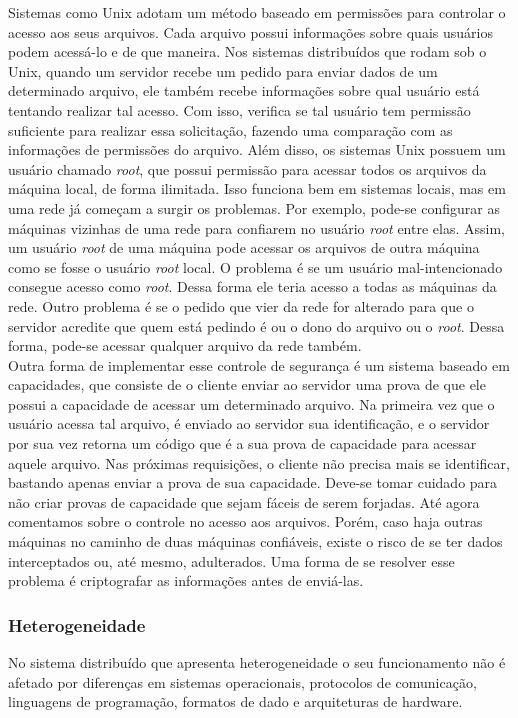 	
	Sistemas como Unix adotam um método baseado em permissões para controlar o acesso aos seus arquivos. Cada arquivo possui informações sobre quais usuários podem acessá-lo e de que maneira.
	Nos sistemas distribuídos que rodam sob o Unix, quando um servidor recebe um pedido para enviar dados de um determinado arquivo, ele também recebe informações sobre qual usuário está tentando realizar tal acesso. Com isso, verifica se tal usuário tem permissão suficiente para realizar essa solicitação, fazendo uma comparação com as informações de permissões do arquivo.
	Além disso, os sistemas Unix possuem um usuário chamado \textit{root}, que possui permissão para acessar todos os arquivos da máquina local, de forma ilimitada. Isso funciona bem em sistemas locais, mas em uma rede já começam a surgir os problemas.
	Por exemplo, pode-se configurar as máquinas vizinhas de uma rede para confiarem no usuário \textit{root} entre elas. Assim, um usuário \textit{root} de uma máquina pode acessar os arquivos de outra máquina como se fosse o usuário \textit{root} local. O problema é se um usuário mal-intencionado consegue acesso como \textit{root}. Dessa forma ele teria acesso a todas as máquinas da rede. Outro problema é se o pedido que vier da rede for alterado para que o servidor acredite que quem está pedindo é ou o dono do arquivo ou o \textit{root}. Dessa forma, pode-se acessar qualquer arquivo da rede também. \\
	
	Outra forma de implementar esse controle de segurança é um sistema baseado em capacidades, que consiste de o cliente enviar ao servidor uma prova de que ele possui a capacidade de acessar um determinado arquivo. Na primeira vez que o usuário acessa tal arquivo, é enviado ao servidor sua identificação, e o servidor por sua vez retorna um código que é a sua prova de capacidade para acessar aquele arquivo. Nas próximas requisições, o cliente não precisa mais se identificar, bastando apenas enviar a prova de sua capacidade. Deve-se tomar cuidado para não criar provas de capacidade que sejam fáceis de serem forjadas. Até agora comentamos sobre o controle no acesso aos arquivos. Porém, caso haja outras máquinas no caminho de duas máquinas confiáveis, existe o risco de se ter dados interceptados ou, até mesmo, adulterados. Uma forma de se resolver esse problema é criptografar as informações antes de enviá-las.
	
	\subsubsection{Heterogeneidade}
	No sistema distribuído que apresenta heterogeneidade o seu funcionamento não é afetado por diferenças em sistemas operacionais, protocolos de comunicação, linguagens de programação, formatos de dado e arquiteturas de hardware. 
	
